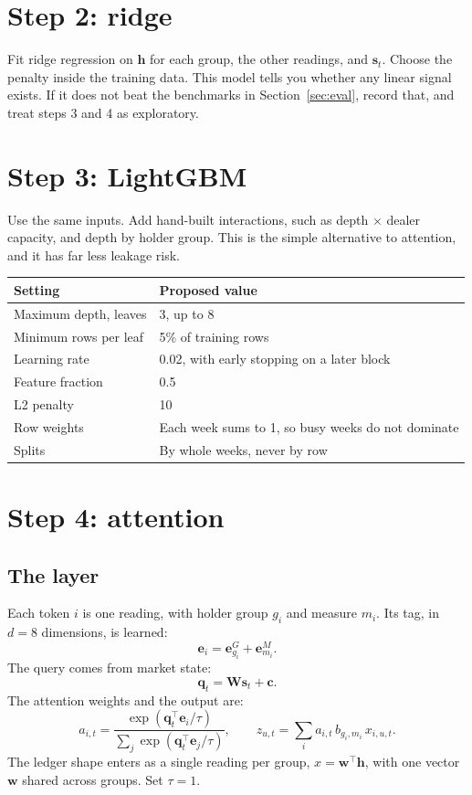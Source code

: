 \documentclass[11pt]{article}
\begin{document}
\section{Step 2: ridge}
Fit ridge regression on $\mathbf{h}$ for each group, the other readings, and $\mathbf{s}_t$. Choose the penalty inside the training data. This model tells you whether any linear signal exists. If it does not beat the benchmarks in Section~\ref{sec:eval}, record that, and treat steps 3 and 4 as exploratory.

\section{Step 3: LightGBM}
Use the same inputs. Add hand-built interactions, such as depth $\times$ dealer capacity, and depth by holder group. This is the simple alternative to attention, and it has far less leakage risk.

\begin{center}\small
\begin{tabular}{@{}ll@{}}
\toprule
Setting & Proposed value \\
\midrule
Maximum depth, leaves & 3, up to 8 \\
Minimum rows per leaf & 5\% of training rows \\
Learning rate & 0.02, with early stopping on a later block \\
Feature fraction & 0.5 \\
L2 penalty & 10 \\
Row weights & Each week sums to 1, so busy weeks do not dominate \\
Splits & By whole weeks, never by row \\
\bottomrule
\end{tabular}
\end{center}

\section{Step 4: attention}
\subsection{The layer}
Each token $i$ is one reading, with holder group $g_i$ and measure $m_i$. Its tag, in $d = 8$ dimensions, is learned:
\[
\mathbf{e}_i = \mathbf{e}^{G}_{g_i} + \mathbf{e}^{M}_{m_i}.
\]
The query comes from market state:
\[
\mathbf{q}_t = \mathbf{W}\mathbf{s}_t + \mathbf{c}.
\]
The attention weights and the output are:
\[
a_{i,t} = \frac{\exp(\mathbf{q}_t^\top \mathbf{e}_i / \tau)}{\sum_j \exp(\mathbf{q}_t^\top \mathbf{e}_j / \tau)},
\qquad
z_{u,t} = \sum_i a_{i,t}\, b_{g_i,m_i}\, x_{i,u,t} .
\]
The ledger shape enters as a single reading per group, $x = \mathbf{w}^\top \mathbf{h}$, with one vector $\mathbf{w}$ shared across groups. Set $\tau = 1$.
\end{document}
